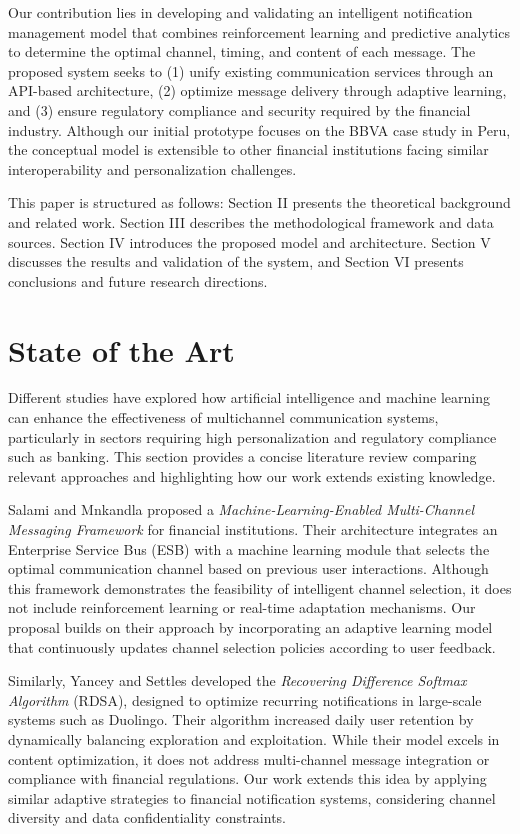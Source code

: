 \documentclass[conference]{IEEEtran}
\begin{document}
Our contribution lies in developing and validating an intelligent notification management model that combines reinforcement learning and predictive analytics to determine the optimal channel, timing, and content of each message. The proposed system seeks to (1) unify existing communication services through an API-based architecture, (2) optimize message delivery through adaptive learning, and (3) ensure regulatory compliance and security required by the financial industry. Although our initial prototype focuses on the BBVA case study in Peru, the conceptual model is extensible to other financial institutions facing similar interoperability and personalization challenges.

This paper is structured as follows: Section II presents the theoretical background and related work. Section III describes the methodological framework and data sources. Section IV introduces the proposed model and architecture. Section V discusses the results and validation of the system, and Section VI presents conclusions and future research directions.

\section{State of the Art}

Different studies have explored how artificial intelligence and machine learning can enhance the effectiveness of multichannel communication systems, particularly in sectors requiring high personalization and regulatory compliance such as banking. This section provides a concise literature review comparing relevant approaches and highlighting how our work extends existing knowledge.

Salami and Mnkandla \cite{salami2022} proposed a \textit{Machine-Learning-Enabled Multi-Channel Messaging Framework} for financial institutions. Their architecture integrates an Enterprise Service Bus (ESB) with a machine learning module that selects the optimal communication channel based on previous user interactions. Although this framework demonstrates the feasibility of intelligent channel selection, it does not include reinforcement learning or real-time adaptation mechanisms. Our proposal builds on their approach by incorporating an adaptive learning model that continuously updates channel selection policies according to user feedback.

Similarly, Yancey and Settles \cite{yancey2020} developed the \textit{Recovering Difference Softmax Algorithm} (RDSA), designed to optimize recurring notifications in large-scale systems such as Duolingo. Their algorithm increased daily user retention by dynamically balancing exploration and exploitation. While their model excels in content optimization, it does not address multi-channel message integration or compliance with financial regulations. Our work extends this idea by applying similar adaptive strategies to financial notification systems, considering channel diversity and data confidentiality constraints.
\end{document}
